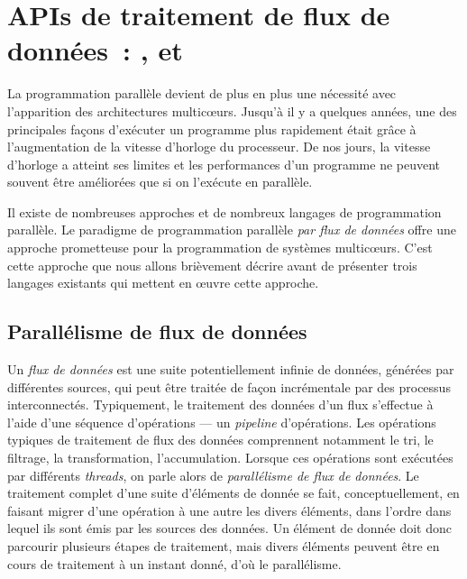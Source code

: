 
\chapter{APIs de traitement de flux de donn\'ees~: ,  et }
\label{outils_connus}
\label{outils_connus.chap}


La programmation parall\`ele devient de plus en plus une n\'ecessit\'e avec l'apparition des architectures multicœurs. Jusqu'\`a il y a quelques ann\'ees, une des principales fa\c{c}ons d'ex\'ecuter un programme plus rapidement \'etait gr\^ace \`a l'augmentation de la vitesse d'horloge du processeur. De nos jours, la vitesse d'horloge a atteint ses limites et les performances d'un programme ne peuvent souvent \^etre am\'elior\'ees que si on l'ex\'ecute en parall\`ele. 

Il existe de nombreuses approches et de nombreux langages de programmation parall\`ele.
%
Le paradigme de programmation parall\`ele \emph{par flux de donn\'ees} offre une approche prometteuse pour la programmation de syst\`emes multicœurs. C'est cette approche que nous allons bri\`evement d\'ecrire avant de pr\'esenter trois langages existants qui mettent en \oe{}uvre cette approche.

\section{Parall\'elisme de flux de donn\'ees}


Un \emph{flux de donn\'ees} est une suite potentiellement infinie de donn\'ees, g\'en\'er\'ees par diff\'erentes sources, qui peut \^etre trait\'ee de fa\c{c}on incr\'ementale par des processus interconnect\'es. Typiquement, le traitement des donn\'ees d'un flux s'effectue \`a l'aide d'une s\'equence d'op\'erations --- un \emph{pipeline} d'op\'erations. Les op\'erations typiques de traitement de flux des donn\'ees comprennent notamment le tri, le filtrage,  la transformation, l'accumulation. Lorsque ces op\'erations sont ex\'ecut\'ees par diff\'erents \emph{threads}, on parle alors de \emph{parall\'elisme de flux de donn\'ees}. Le traitement complet d'une suite d'\'el\'ements de donn\'ee se fait, conceptuellement, en faisant migrer d'une op\'eration \`a une autre les divers \'el\'ements, dans l'ordre dans lequel ils sont \'emis par les sources des donn\'ees.
%
Un \'el\'ement de donn\'ee doit donc parcourir plusieurs \'etapes de traitement, mais divers \'el\'ements peuvent \^etre en cours de traitement \`a un instant donn\'e, d'o\`u le parall\'elisme.

